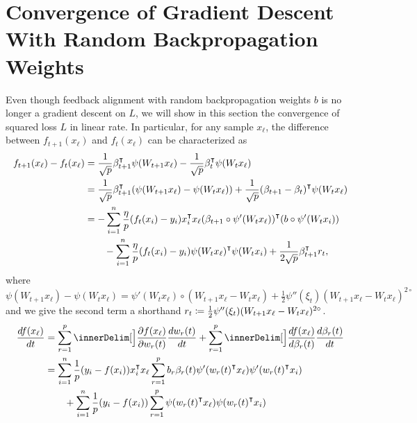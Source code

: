 \section{Convergence of Gradient Descent With Random Backpropagation Weights}

Even though feedback alignment with random backpropagation weights $b$ is no longer a gradient descent on $L$, we will show in this section the convergence of squared loss $L$ in linear rate. In particular, for any sample $x_\ell$, the difference between $f_{t+1}(x_\ell)$ and $f_t(x_\ell)$ can be characterized as
\begin{align}
    \begin{split}
        f_{t+1}(x_\ell) - f_t(x_\ell) & = \frac{1}{\sqrt p} \beta_{t+1}\transpose\psi(W_{t+1}x_\ell) - \frac{1}{\sqrt p} \beta_t\transpose\psi(W_t x_\ell) \\
        & = \frac{1}{\sqrt p} \beta_{t+1}\transpose(\psi(W_{t+1}x_\ell) - \psi(W_t x_\ell)) + \frac{1}{\sqrt p} (\beta_{t+1} - \beta_t)\transpose\psi(W_t x_\ell) \\
        & = -\sum_{i=1}^n \frac{\eta}{p} (f_t(x_i) - y_i) x_i\transpose x_\ell (\beta_{t+1}\circ \psi'(W_t x_\ell))\transpose (b\circ \psi'(W_t x_i)) \\
        & \qquad -\sum_{i=1}^n \frac{\eta}{p} (f_t(x_i) - y_i) \psi(W_t x_\ell)\transpose \psi(W_t x_i) + \frac{1}{2\sqrt{p}} \beta_{t+1}\transpose r_t,
    \end{split}
\end{align}
where $\psi(W_{t+1}x_\ell) - \psi(W_t x_\ell) = \psi'(W_t x_\ell)\circ(W_{t+1} x_\ell - W_t x_\ell) + \frac{1}{2}\psi''(\xi_t) (W_{t+1} x_\ell - W_t x_\ell)^{2\circ}$ and we give the second term a shorthand $r_t \coloneqq \frac{1}{2}\psi''(\xi_t) (W_{t+1} x_\ell - W_t x_\ell)^{2\circ}$.
\begin{align}\label{eqn:f-dynamics}
    \begin{split}
        \frac{\diff f(x_\ell)}{\diff t} & = \sum_{r=1}^p \inner[\Big]{\frac{\partial f(x_\ell)}{\partial w_r(t)}}{\frac{\diff w_r(t)}{\diff t}} + \sum_{r=1}^p \inner[\Big]{\frac{\diff f(x_\ell)}{\diff \beta_r(t)}}{\frac{\diff \beta_r(t)}{\diff t}} \\
        & = \sum_{i=1}^n \frac{1}{p} (y_i - f(x_i)) x_i\transpose x_\ell \sum_{r=1}^p b_r\beta_r(t)\psi'(w_r(t)\transpose x_\ell) \psi'(w_r(t)\transpose x_i) \\
        & \qquad + \sum_{i=1}^n \frac{1}{p}(y_i - f(x_i)) \sum_{r=1}^p \psi(w_r(t)\transpose x_\ell)\psi(w_r(t)\transpose x_i)
    \end{split}
\end{align}
